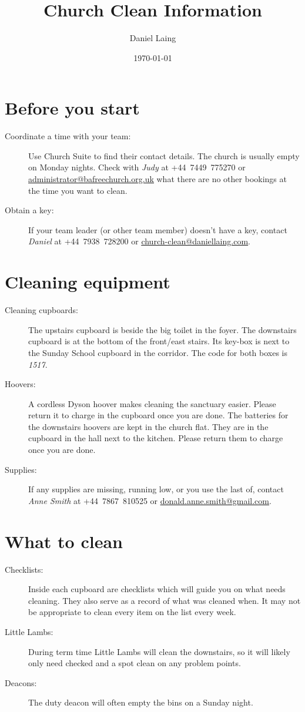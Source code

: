 \documentclass[a4paper, 12pt, final, oneside]{article}
\title{Church Clean Information}
\author{Daniel Laing}
\date{\today}
\newcommand\email[1]{\href{mailto:#1}{\underline{#1}}}
\begin{document}
\maketitle

\section*{Before you start}
\begin{description}
    \item[Coordinate a time with your team:] Use Church Suite to find their contact details. The church is usually empty
        on Monday nights. Check with \emph{Judy} at +44~7449~775270 or \email{administrator@bafreechurch.org.uk} what
        there are no other bookings at the time you want to clean.
    \item[Obtain a key:] If your team leader (or other team member) doesn't have a key, contact \emph{Daniel} at
        +44~7938~728200 or \email{church-clean@daniellaing.com}.
\end{description}

\section*{Cleaning equipment}
\begin{description}
    \item[Cleaning cupboards:] The upstairs cupboard is beside the big toilet in the foyer. The downstairs cupboard is
        at the bottom of the front/east stairs. Its key-box is next to the Sunday School cupboard in the corridor. The
        code for both boxes is \emph{1517}.
    \item[Hoovers:] A cordless Dyson hoover makes cleaning the sanctuary easier. Please return it to charge in the
        cupboard once you are done. The batteries for the downstairs hoovers are kept in the church flat. They are in
        the cupboard in the hall next to the kitchen. Please return them to charge once you are done.
    \item[Supplies:] If any supplies are missing, running low, or you use the last of, contact \emph{Anne Smith} at
        +44~7867~810525 or \email{donald.anne.smith@gmail.com}.
\end{description}

\section*{What to clean}
\begin{description}
    \item[Checklists:] Inside each cupboard are checklists which will guide you on what needs cleaning. They also serve
        as a record of what was cleaned when. It may not be appropriate to clean every item on the list every week.
    \item[Little Lambs:] During term time Little Lambs will clean the downstairs, so it will likely only need checked
        and a spot clean on any problem points.
    \item[Deacons:] The duty deacon will often empty the bins on a Sunday night.
\end{description}
\end{document}
